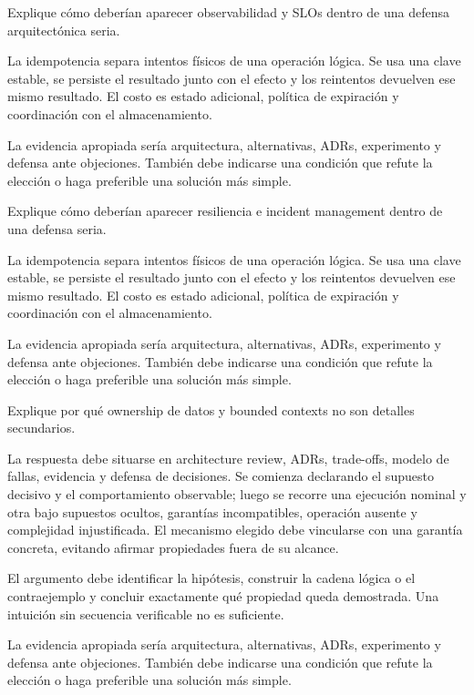 \documentclass[variant=guia,cover=institutional,mode=screen]{ua-engineering-v6-article}
\begin{document}
\begin{uaexercise}
Explique cómo deberían aparecer observabilidad y SLOs dentro de una defensa arquitectónica seria.
\end{uaexercise}
\begin{uaanswer}
La idempotencia separa intentos físicos de una operación lógica. Se usa una clave estable, se persiste el resultado junto con el efecto y los reintentos devuelven ese mismo resultado. El costo es estado adicional, política de expiración y coordinación con el almacenamiento.

La evidencia apropiada sería arquitectura, alternativas, ADRs, experimento y defensa ante objeciones. También debe indicarse una condición que refute la elección o haga preferible una solución más simple.
\end{uaanswer}

\begin{uaexercise}
Explique cómo deberían aparecer resiliencia e incident management dentro de una defensa seria.
\end{uaexercise}
\begin{uaanswer}
La idempotencia separa intentos físicos de una operación lógica. Se usa una clave estable, se persiste el resultado junto con el efecto y los reintentos devuelven ese mismo resultado. El costo es estado adicional, política de expiración y coordinación con el almacenamiento.

La evidencia apropiada sería arquitectura, alternativas, ADRs, experimento y defensa ante objeciones. También debe indicarse una condición que refute la elección o haga preferible una solución más simple.
\end{uaanswer}

\begin{uaexercise}
Explique por qué ownership de datos y bounded contexts no son detalles secundarios.
\end{uaexercise}
\begin{uaanswer}
La respuesta debe situarse en architecture review, ADRs, trade-offs, modelo de fallas, evidencia y defensa de decisiones. Se comienza declarando el supuesto decisivo y el comportamiento observable; luego se recorre una ejecución nominal y otra bajo supuestos ocultos, garantías incompatibles, operación ausente y complejidad injustificada. El mecanismo elegido debe vincularse con una garantía concreta, evitando afirmar propiedades fuera de su alcance.

El argumento debe identificar la hipótesis, construir la cadena lógica o el contraejemplo y concluir exactamente qué propiedad queda demostrada. Una intuición sin secuencia verificable no es suficiente.

La evidencia apropiada sería arquitectura, alternativas, ADRs, experimento y defensa ante objeciones. También debe indicarse una condición que refute la elección o haga preferible una solución más simple.
\end{uaanswer}
\end{document}

